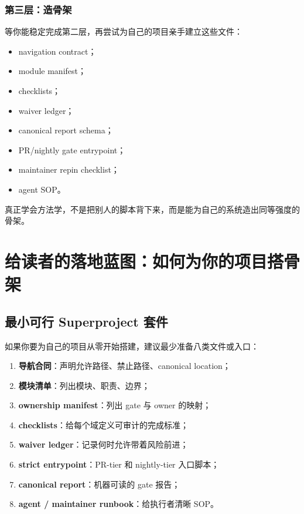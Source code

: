 \documentclass[UTF8,11pt,a4paper,oneside]{ctexbook}
\begin{document}
\subsection{第三层：造骨架}

等你能稳定完成第二层，再尝试为自己的项目亲手建立这些文件：

\begin{itemize}
  \item navigation contract；
  \item module manifest；
  \item checklists；
  \item waiver ledger；
  \item canonical report schema；
  \item PR/nightly gate entrypoint；
  \item maintainer repin checklist；
  \item agent SOP。
\end{itemize}

真正学会方法学，不是把别人的脚本背下来，而是能为自己的系统造出同等强度的骨架。

\chapter{给读者的落地蓝图：如何为你的项目搭骨架}

\section{最小可行 Superproject 套件}

如果你要为自己的项目从零开始搭建，建议最少准备八类文件或入口：

\begin{enumerate}
  \item \textbf{导航合同}：声明允许路径、禁止路径、canonical location；
  \item \textbf{模块清单}：列出模块、职责、边界；
  \item \textbf{ownership manifest}：列出 gate 与 owner 的映射；
  \item \textbf{checklists}：给每个域定义可审计的完成标准；
  \item \textbf{waiver ledger}：记录何时允许带着风险前进；
  \item \textbf{strict entrypoint}：PR-tier 和 nightly-tier 入口脚本；
  \item \textbf{canonical report}：机器可读的 gate 报告；
  \item \textbf{agent / maintainer runbook}：给执行者清晰 SOP。
\end{enumerate}
\end{document}
